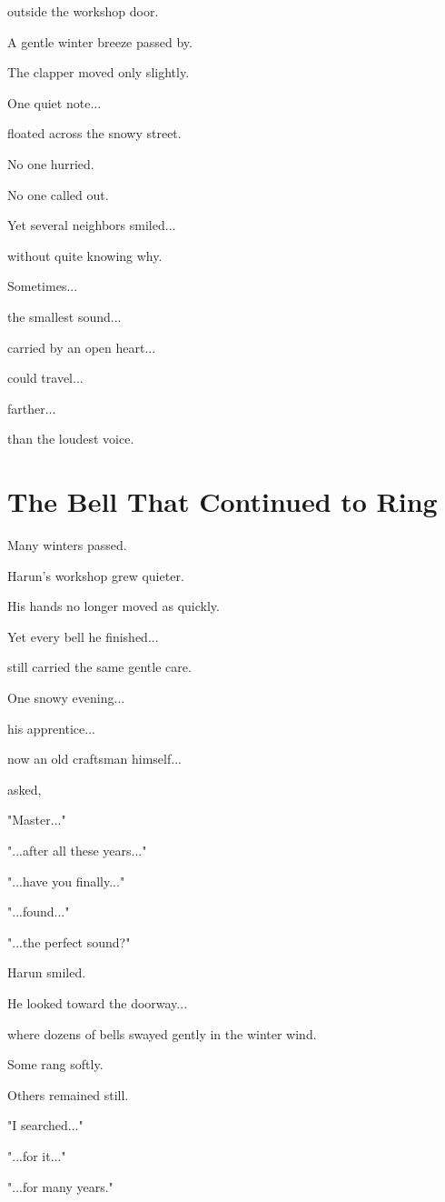 \documentclass[12pt,openany]{book}
\begin{document}
outside the workshop door.

A gentle winter breeze passed by.

The clapper moved only slightly.

One quiet note...

floated across the snowy street.

No one hurried.

No one called out.

Yet several neighbors smiled...

without quite knowing why.

Sometimes...

the smallest sound...

carried by an open heart...

could travel...

farther...

than the loudest voice.
\section*{The Bell That Continued to Ring}

Many winters passed.

Harun's workshop grew quieter.

His hands no longer moved as quickly.

Yet every bell he finished...

still carried the same gentle care.

One snowy evening...

his apprentice...

now an old craftsman himself...

asked,

"Master..."

"...after all these years..."

"...have you finally..."

"...found..."

"...the perfect sound?"

Harun smiled.

He looked toward the doorway...

where dozens of bells swayed gently in the winter wind.

Some rang softly.

Others remained still.

"I searched..."

"...for it..."

"...for many years."
\end{document}
